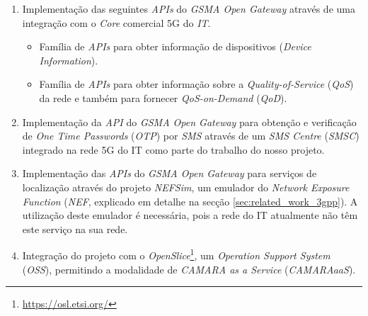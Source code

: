 \begin{enumerate}
	\item Implementação das seguintes \emph{APIs} do \emph{GSMA Open Gateway}
	      através de uma integração com o \emph{Core} comercial 5G do \emph{IT}.
	      \begin{itemize}
		      \item Família de \emph{APIs} para obter informação de
		            dispositivos (\emph{Device Information}).
		      \item Família de \emph{APIs} para obter informação sobre a
		            \emph{Quality-of-Service} (\emph{QoS}) da rede e também para
		            fornecer \emph{QoS-on-Demand} (\emph{QoD}).
	      \end{itemize}
	\item Implementação da \emph{API} do \emph{GSMA Open Gateway} para obtenção
	      e verificação de \emph{One Time Passwords} (\emph{OTP}) por \emph{SMS}
	      através de um \emph{SMS Centre} (\emph{SMSC}) integrado na rede 5G do
	      IT como parte do trabalho do nosso projeto.
	\item Implementação das \emph{APIs} do \emph{GSMA Open Gateway} para
	      serviços de localização através do projeto \emph{NEFSim}, um emulador
	      do \emph{Network Exposure Function} (\emph{NEF}, explicado em detalhe
	      na secção \ref{sec:related_work_3gpp}). A utilização deste emulador é
	      necessária, pois a rede do IT atualmente não têm este serviço na sua
	      rede.
	\item Integração do projeto com o
	      \emph{OpenSlice}\footnote{\url{https://osl.etsi.org/}}, um
	      \emph{Operation Support System} (\emph{OSS}), permitindo a modalidade
	      de \emph{CAMARA as a Service} (\emph{CAMARAaaS}).
\end{enumerate}
